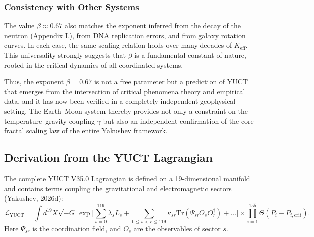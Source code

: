 \documentclass[12pt]{article}
\theoremstyle{remark}
\newcommand{\lagr}{\mathcal{L}}
\begin{document}
	\subsubsection{Consistency with Other Systems}
	The value \(\beta \approx 0.67\) also matches the exponent inferred from the decay of the neutron (Appendix L), from DNA replication errors, and from galaxy rotation curves. In each case, the same scaling relation holds over many decades of \(K_{\mathrm{eff}}\). This universality strongly suggests that \(\beta\) is a fundamental constant of nature, rooted in the critical dynamics of all coordinated systems.
	
	Thus, the exponent \(\beta = 0.67\) is not a free parameter but a prediction of YUCT that emerges from the intersection of critical phenomena theory and empirical data, and it has now been verified in a completely independent geophysical setting. The Earth--Moon system thereby provides not only a constraint on the temperature--gravity coupling \(\gamma\) but also an independent confirmation of the core fractal scaling law of the entire Yakushev framework.
	
	\subsection{Derivation from the YUCT Lagrangian}
	\label{subsec:lagrangian-derivation}
	
	The complete YUCT V35.0 Lagrangian is defined on a 19-dimensional manifold and contains terms coupling the gravitational and electromagnetic sectors (Yakushev, 2026d):
	\begin{equation}
		\lagr_{\text{YUCT}} = \int d^{19}X \sqrt{-G} \, 
		\exp\Bigg[ \sum_{s=0}^{119} \lambda_s L_s + \sum_{0\le s<r\le119} \kappa_{sr} \mathrm{Tr}(\Psi_{sr} O_s O_r^\dagger) + \dots \Bigg]
		\times \prod_{i=1}^{155} \Theta(P_i - P_{i,\text{crit}}).
		\label{eq:lagrangian-full}
	\end{equation}
	Here $\Psi_{sr}$ is the coordination field, and $O_s$ are the observables of sector $s$. 
	
\end{document}
